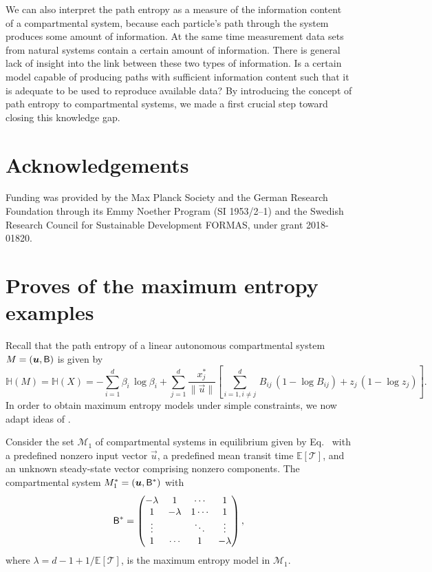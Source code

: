 \documentclass[smallextended]{svjour3}
\makeatletter
\renewcommand*{\eqref}[1]{%
  \hyperref[{#1}]{\textup{\tagform@{\ref*{#1}}}}%
}
\newcommand{\E}{\mathbb{E}}
\newcommand{\TT}{\mathcal{T}}
\renewcommand{\H}{\mathbb{H}}
\newcommand{\suml}{\sum\limits}
\newcommand{\vnorms}[1]{\|#1\|}
\makeatother
\begin{document}
We can also interpret the path entropy as a measure of the information content of a compartmental system, because each particle's path through the system produces some amount of information.
At the same time measurement data sets from natural systems contain a certain amount of information.
There is general lack of insight into the link between these two types of information.
Is a certain model capable of producing paths with sufficient information content such that it is adequate to be used to reproduce available data?
By introducing the concept of path entropy to compartmental systems, we made a first crucial step toward closing this knowledge gap.




\section{Acknowledgements}
Funding was provided by the Max Planck Society and the German Research Foundation through its Emmy Noether Program (SI 1953/2--1) and the Swedish Research Council for Sustainable Development FORMAS, under grant 2018-01820.






\appendix

\section{Proves of the maximum entropy examples}
	Recall that the path entropy of a linear autonomous compartmental system $M=(\vec{u},\tens{B})$ is given by
	\begin{equation*}
		\H(M) = \H(X) = -\suml_{i=1}^d\beta_i\,\log\beta_i + \suml_{j=1}^d \frac{x^\ast_j}{\vnorms{\vec{u}}}\left[\suml_{i=1,i\neq j}^d \,B_{ij}\,(1-\log B_{ij}) + z_j\,(1-\log z_j)\right].
	\end{equation*}
	In order to obtain maximum entropy models under simple constraints, we now adapt ideas of \cite{Girardin2004MCAP}.

	\begin{proposition}
    \label{proposition:max_ent_example_1}
		Consider the set $\mathcal{M}_1$ of compartmental systems in equilibrium given by Eq.~\eqref{eqn:lin_CS_sys}  with a predefined nonzero input vector $\vec{u}$, a predefined mean transit time $\E\left[\TT\right]$, and an unknown steady-state vector comprising nonzero components.
		The compartmental system $M^\ast_1=(\vec{u},\tens{B}^\ast)$ with 
		\begin{equation*}
			\mathsf{B}^\ast = \begin{pmatrix}
									-\lambda & 1 & \cdots & 1\\
									1 & -\lambda & 1 \cdots & 1 \\
									\vdots & & \ddots & \vdots\\
									1 & \cdots & 1 & -\lambda
             \end{pmatrix},
		\end{equation*}
		where $\lambda=d-1+1/\E\left[\TT\right]$, 		
		is the maximum entropy model in $\mathcal{M}_1$.
	\end{proposition}
\end{document}
